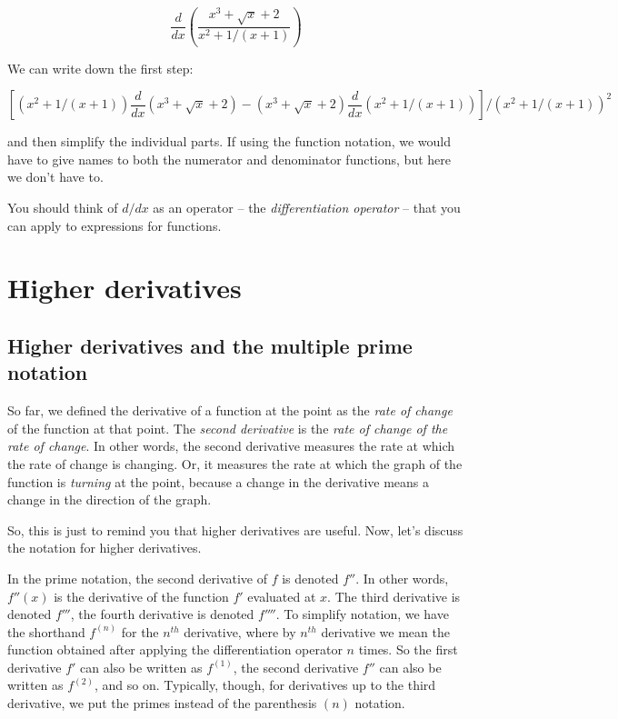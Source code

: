 \documentclass[10pt]{amsart}
\begin{document}
$$\frac{d}{dx}\left(\frac{x^3 + \sqrt{x} + 2}{x^2 + 1/(x+1)}\right)$$

We can write down the first step:

$$\left[(x^2 + 1/(x+1))\frac{d}{dx}(x^3 + \sqrt{x} + 2) - (x^3 + \sqrt{x} + 2)\frac{d}{dx}(x^2 + 1/(x+1))\right]/(x^2 + 1/(x+1))^2$$

and then simplify the individual parts. If using the function
notation, we would have to give names to both the numerator and
denominator functions, but here we don't have to.

You should think of $d/dx$ as an operator -- the {\em differentiation
operator} -- that you can apply to expressions for functions.

\section{Higher derivatives}

\subsection{Higher derivatives and the multiple prime notation}

So far, we defined the derivative of a function at the point as the
{\em rate of change} of the function at that point. The {\em
second derivative} is the {\em rate of change of
the rate of change}. In other words, the second derivative measures
the rate at which the rate of change is changing. Or, it measures the
rate at which the graph of the function is {\em turning} at the point,
because a change in the derivative means a change in the direction of
the graph.

So, this is just to remind you that higher derivatives are
useful. Now, let's discuss the notation for higher derivatives.

In the prime notation, the second derivative of $f$ is denoted
$f''$. In other words, $f''(x)$ is the derivative of the function $f'$
evaluated at $x$. The third derivative is denoted $f'''$, the fourth
derivative is denoted $f''''$. To simplify notation, we have the
shorthand $f^{(n)}$ for the $n^{th}$ derivative, where by $n^{th}$
derivative we mean the function obtained after applying the
differentiation operator $n$ times. So the first derivative $f'$ can
also be written as $f^{(1)}$, the second derivative $f''$ can also be
written as $f^{(2)}$, and so on. Typically, though, for derivatives up
to the third derivative, we put the primes instead of the parenthesis
$(n)$ notation.
\end{document}
